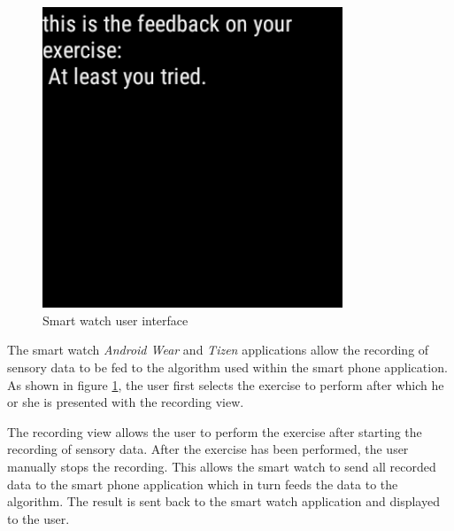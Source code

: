 \begin{figure}[b!]
\begin{minipage}{0.20\textwidth}
    \end{minipage}
    \begin{minipage}{0.20\textwidth}
      \centering
        \includegraphics[width=0.80\textwidth]{00_resources/figures/Android_Watch_FeedbackView.png}
    \end{minipage}
  \caption{Smart watch user interface}
  \label{fig:smwui}
\end{figure}

The smart watch \textit{Android Wear} and \textit{Tizen} applications allow the
recording of sensory data to be fed to the algorithm used within the smart
phone application. As shown in figure \ref{fig:smwui}, the user first selects
the exercise to perform after which he or she is presented with the recording
view.

The recording view allows the user to perform the exercise after starting the
recording of sensory data. After the exercise has been performed, the user
manually stops the recording. This allows the smart watch to send all recorded
data to the smart phone application which in turn feeds the data to the
algorithm. The result is sent back to the smart watch application and displayed
to the user.
